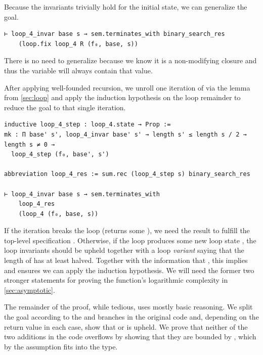 Because the invariants trivially hold for the initial state, we can generalize
the goal.

\begin{verbatim}
⊢ loop_4_invar base s → sem.terminates_with binary_search_res
    (loop.fix loop_4 R (f₀, base, s))
\end{verbatim}

There is no need to generalize  because we know it is a non-modifying closure
and thus the variable  will always contain that value.

After applying well-founded recursion, we unroll one iteration of
 via the lemma  from \autoref{sec:loop} and
apply the induction hypothesis on the loop remainder to reduce the goal to that
single iteration.

\begin{verbatim}
inductive loop_4_step : loop_4.state → Prop :=
mk : Π base' s', loop_4_invar base' s' → length s' ≤ length s / 2 → length s ≠ 0 →
  loop_4_step (f₀, base', s')

abbreviation loop_4_res := sum.rec (loop_4_step s) binary_search_res

⊢ loop_4_invar base s → sem.terminates_with
    loop_4_res
    (loop_4 (f₀, base, s))
\end{verbatim}

If the iteration breaks the loop (returns some ), we need the
result to fulfill the top-level specification .
Otherwise, if the loop produces
some new loop state , the loop invariants should be upheld
together with a loop \emph{variant} saying that the length of  has at
least halved. Together with the information that , this
implies  and ensures we can apply the induction
hypothesis. We will
need the former two stronger statements for proving the function's logarithmic
complexity in \autoref{sec:asymptotic}.

The remainder of the proof, while tedious, uses mostly basic reasoning. We split
the goal according to the  and  branches in the original
code and, depending on the return value in each case, show that
 or  is upheld. We prove that neither
of the two additions in the code overflows by showing that they are bounded by
, which by the assumption  fits into
the  type.
